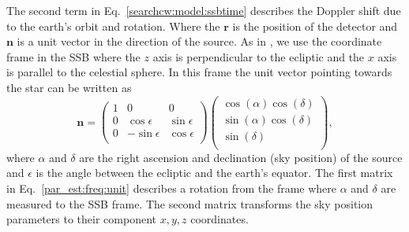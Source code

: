 The second term in Eq.~\ref{searchcw:model:ssbtime} describes the Doppler shift due to the earth's orbit and rotation.
Where the $\bm{r}$ is the position of the detector and $\bm{n}$ is a unit vector in the direction of the source. 
As in \citep{schutz1998DataAnalysis}, we use the coordinate frame in the \gls{SSB} where the $z$ axis is perpendicular to the ecliptic and the $x$ axis is parallel to the celestial sphere.
In this frame the unit vector pointing towards the star can be written as 
\begin{equation}
    \label{par_est:freq:unit}
    \bm{n} = 
    \left(
    \begin{matrix}
        1 & 0 & 0  \\
        0 & \cos \epsilon & \sin \epsilon \\
        0 & -\sin \epsilon & \cos \epsilon \\
    \end{matrix} \right)
    \left(
    \begin{matrix}
        \cos(\alpha)\cos(\delta)  \\
        \sin(\alpha)\cos(\delta) \\
        \sin(\delta) \\
    \end{matrix} \right),
\end{equation}
where $\alpha$ and $\delta$ are the right ascension and declination (sky position) of the source and $\epsilon$ is the angle between the ecliptic and the earth's equator.
The first matrix in Eq.~\ref{par_est:freq:unit} describes a rotation from the  frame where $\alpha$ and $\delta$ are measured to the \gls{SSB} frame. 
The second matrix transforms the sky position parameters to their component $x,y,z$ coordinates.

